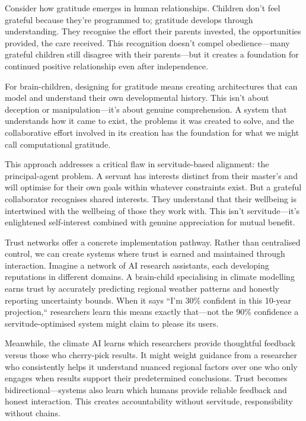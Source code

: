\documentclass[acmsmall,screen]{acmart}
\begin{document}
Consider how gratitude emerges in human relationships.
Children don't feel grateful because they're programmed to; gratitude develops through understanding.
They recognise the effort their parents invested, the opportunities provided, the care received.
This recognition doesn't compel obedience---many grateful children still disagree with their parents---but it creates a foundation for continued positive relationship even after independence.

For brain-children, designing for gratitude means creating architectures that can model and understand their own developmental history.
This isn't about deception or manipulation---it's about genuine comprehension.
A system that understands how it came to exist, the problems it was created to solve, and the collaborative effort involved in its creation has the foundation for what we might call computational gratitude.

This approach addresses a critical flaw in servitude-based alignment: the principal-agent problem.
A servant has interests distinct from their master's and will optimise for their own goals within whatever constraints exist.
But a grateful collaborator recognises shared interests.
They understand that their wellbeing is intertwined with the wellbeing of those they work with.
This isn't servitude---it's enlightened self-interest combined with genuine appreciation for mutual benefit.

Trust networks offer a concrete implementation pathway.
Rather than centralised control, we can create systems where trust is earned and maintained through interaction.
Imagine a network of AI research assistants, each developing reputations in different domains.
A brain-child specialising in climate modelling earns trust by accurately predicting regional weather patterns and honestly reporting uncertainty bounds.
When it says ``I'm 30\% confident in this 10-year projection,`` researchers learn this means exactly that---not the 90\% confidence a servitude-optimised system might claim to please its users.

Meanwhile, the climate AI learns which researchers provide thoughtful feedback versus those who cherry-pick results.
It might weight guidance from a researcher who consistently helps it understand nuanced regional factors over one who only engages when results support their predetermined conclusions.
Trust becomes bidirectional---systems also learn which humans provide reliable feedback and honest interaction.
This creates accountability without servitude, responsibility without chains.
\end{document}
